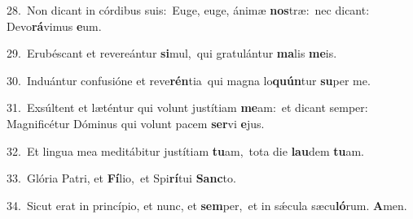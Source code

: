 {\numbfont\textcolor{\numbcolor}{28.}}~Non dicant in córdibus suis:~\dagger Euge, euge, ánimæ \textbf{nos}\-træ:~\star nec dicant: Devo\-\textbf{rá}\-vimus \textbf{e}\-um.\par
{\numbfont\textcolor{\numbcolor}{29.}}~Erubéscant et revereántur \textbf{si}\-mul,~\star qui gratulántur \textbf{ma}\-lis \textbf{me}\-is.\par
{\numbfont\textcolor{\numbcolor}{30.}}~Induántur confusióne et reve\-\textbf{rén}\-tia~\star qui magna lo\-\textbf{quún}\-tur \textbf{su}\-per me.\par
{\numbfont\textcolor{\numbcolor}{31.}}~Exsúltent et læténtur qui volunt justítiam \textbf{me}\-am:~\star et dicant semper: Magnificétur Dóminus qui volunt pacem \textbf{ser}\-vi \textbf{e}\-jus.\par
{\numbfont\textcolor{\numbcolor}{32.}}~Et lingua mea meditábitur justítiam \textbf{tu}\-am,~\star tota die \textbf{lau}\-dem \textbf{tu}\-am.\par
{\numbfont\textcolor{\numbcolor}{33.}}~Glória Patri, et \textbf{Fí}\-lio,~\star et Spi\-\textbf{rí}\-tui \textbf{Sanc}\-to.\par
{\numbfont\textcolor{\numbcolor}{34.}}~Sicut erat in princípio, et nunc, et \textbf{sem}\-per,~\star et in sǽcula sæcu\-\textbf{ló}\-rum. \textbf{A}\-men.\par
